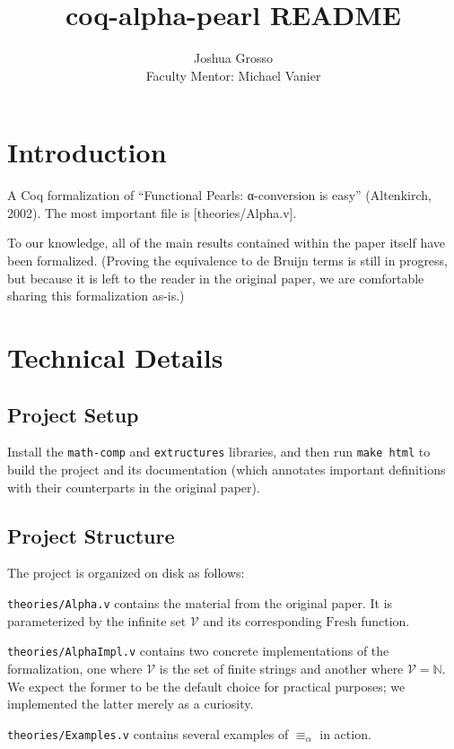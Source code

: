 \documentclass{article}
\title{coq-alpha-pearl README}
\author{Joshua Grosso \\ Faculty Mentor: Michael Vanier}
\begin{document}
\maketitle

\section{Introduction}

A Coq formalization of ``Functional Pearls: α-conversion is easy'' (Altenkirch, 2002). The most important file is [theories/Alpha.v].

To our knowledge, all of the main results contained within the paper itself have been formalized. (Proving the equivalence to de Bruijn terms is still in progress, but because it is left to the reader in the original paper, we are comfortable sharing this formalization as-is.)

\section{Technical Details}

\subsection{Project Setup}

Install the \verb|math-comp| and \verb|extructures| libraries, and then run \verb|make html| to
build the project and its documentation (which annotates important definitions with their
counterparts in the original paper).

\subsection{Project Structure}

The project is organized on disk as follows:

\verb|theories/Alpha.v| contains the material from the original paper. It is parameterized by the infinite set $\mathcal{V}$ and its corresponding $\textrm{Fresh}$ function.

\verb|theories/AlphaImpl.v| contains two concrete implementations of the formalization, one where
$\mathcal{V}$ is the set of finite strings and another where $\mathcal{V} = \mathbb{N}$. We expect
the former to be the default choice for practical purposes; we implemented the latter merely as a
curiosity.

\verb|theories/Examples.v| contains several examples of $\equiv_\alpha$ in action.
\end{document}

